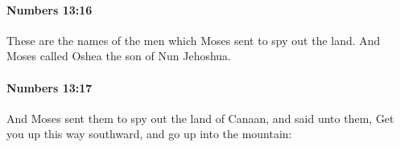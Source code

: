 		\paragraph{Numbers 13:16} %
			\label{NUMBERS-13-16}

			These are the names of the men which Moses sent to spy out the land. And Moses called Oshea the son of Nun Jehoshua.


		\paragraph{Numbers 13:17} %
			\label{NUMBERS-13-17}

			And Moses sent them to spy out the land of Canaan, and said unto them, Get you up this way southward, and go up into the mountain:


